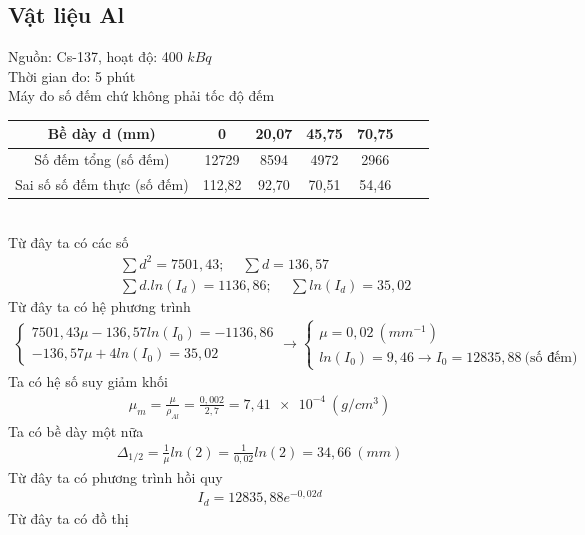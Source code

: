 \documentclass{article}
\begin{document}
\subsection{Vật liệu Al}
Nguồn: Cs-137, hoạt độ: 400 $kBq$ \\
Thời gian đo: 5 phút \\
Máy đo số đếm chứ không phải tốc độ đếm
\begin{table}[!ht]
    \centering
    \begin{tabular}{|c|c|c|c|c|c|c|}
    \hline
        Bề dày d (mm) & 0 & 20,07 & 45,75 & 70,75  \\ \hline
        Số đếm tổng (số đếm) & 12729 & 8594 & 4972 & 2966  \\ \hline
        Sai số số đếm thực (số đếm) & 112,82 & 92,70 & 70,51 & 54,46  \\ \hline
    \end{tabular}
\end{table}\\
Từ đây ta có các số
\begin{align*}
	& \sum{d^2} = 7501,43; \ \quad \sum{d} = 136,57 \\
	& \sum{d.ln(I_d)} = 1136,86; \ \quad \sum{ln(I_d)} = 35,02
\end{align*}
Từ đây ta có hệ phương trình
\begin{align*}
	\begin{cases}
	7501,43\mu - 136,57ln(I_0) = - 1136,86 \\ 
	-136,57\mu + 4ln(I_0) =  35,02
	\end{cases}
	\rightarrow
	\begin{cases}
	\mu = 0,02 \ (mm^{-1}) \\
	ln(I_0) = 9,46 \rightarrow I_0 = 12835,88 \ \text{(số đếm)}
	\end{cases}
\end{align*}
Ta có hệ số suy giảm khối
\begin{align*}
	\mu_m = \frac{\mu}{\rho_{Al}} = \frac{0,002}{2,7} = 7,\num{41e-4} \ (g/cm^3)
\end{align*}
Ta có bề dày một nữa
\begin{align*}
	\Delta_{1/2} = \frac{1}{\mu}ln(2) = \frac{1}{0,02}ln(2) = 34,66 \ (mm)
\end{align*}
Từ đây ta có phương trình hồi quy
\begin{align*}
	I_d = 12835,88e^{-0,02d}
\end{align*}
\newpage
Từ đây ta có đồ thị
\end{document}
